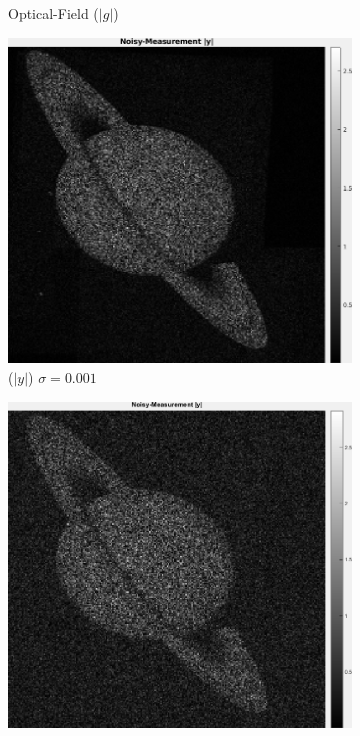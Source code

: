\documentclass[a4paper, 11pt]{article}
\begin{document}
\begin{figure}[h]
\begin{subfigure}[b]{0.22\textwidth}
        \caption{Optical-Field ($|g|$)}
        \label{fig:opticalField}
    \end{subfigure}
    \begin{subfigure}[b]{0.22\textwidth}
        \includegraphics[width=\textwidth]{../Figures/NoisyMeasurementAmplitudeNoiseSigma1e-3.png}
        \caption{($|y|$) $\sigma=0.001$}
        \label{fig:noisyMeasurement1e-2}
    \end{subfigure}
    \begin{subfigure}[b]{0.22\textwidth}
        \includegraphics[width=\textwidth]{../Figures/NoisyMeasurementAmplitudeNoiseSigma1e-1.png}

\end{subfigure}
\end{figure}
\end{document}
